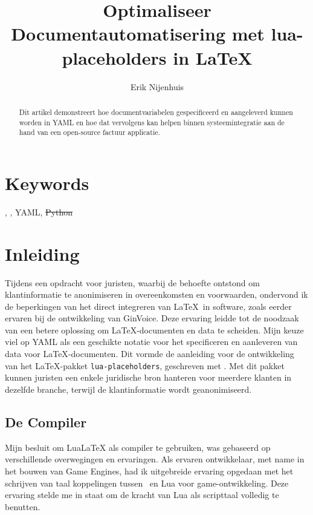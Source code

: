 \documentclass[dutch]{ltugboat}
\title{Optimaliseer Documentautomatisering met lua-placeholders in LaTeX}
\author{Erik Nijenhuis}
\def\pkg#1{\texttt{#1}\cite{#1}}
\begin{document}
    \maketitle

    \begin{abstract}
        Dit artikel demonstreert hoe documentvariabelen gespecificeerd en aangeleverd kunnen worden in YAML en hoe dat vervolgens kan helpen binnen systeemintegratie aan de hand van een open-source factuur applicatie.
    \end{abstract}

    \section*{Keywords}
    \LuaTeX, \LuaLaTeX, YAML, \sout{Python}

    \section{Inleiding}
    Tijdens een opdracht voor juristen, waarbij de behoefte ontstond om klantinformatie te anonimiseren in overeenkomsten en voorwaarden, ondervond ik de beperkingen van het direct integreren van \LaTeX\ in software, zoals eerder ervaren bij de ontwikkeling van GinVoice\cite{ginvoice}.
    Deze ervaring leidde tot de noodzaak van een betere oplossing om \LaTeX-documenten en data te scheiden.
    Mijn keuze viel op YAML als een geschikte notatie voor het specificeren en aanleveren van data voor LaTeX-documenten.
    Dit vormde de aanleiding voor de ontwikkeling van het LaTeX-pakket \pkg{lua-placeholders}, geschreven met \LuaLaTeX.
    Met dit pakket kunnen juristen een enkele juridische bron hanteren voor meerdere klanten in dezelfde branche, terwijl de klantinformatie wordt geanonimiseerd.

    \subsection{De Compiler}
    Mijn besluit om LuaLaTeX als compiler te gebruiken, was gebaseerd op verschillende overwegingen en ervaringen.
    Als ervaren ontwikkelaar, met name in het bouwen van Game Engines, had ik uitgebreide ervaring opgedaan met het schrijven van taal koppelingen tussen \Cplusplus\ en Lua voor game-ontwikkeling.
    Deze ervaring stelde me in staat om de kracht van Lua als scripttaal volledig te benutten.
\end{document}
